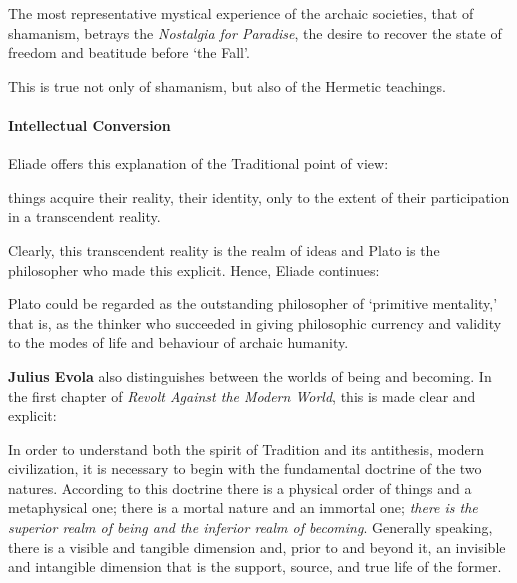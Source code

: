 \begin{quotex}
The most representative mystical experience of the archaic societies, that of shamanism, betrays the \emph{Nostalgia for Paradise}, the desire to recover the state of freedom and beatitude before `the Fall'.
\end{quotex}


This is true not only of shamanism, but also of the Hermetic teachings.

\paragraph{Intellectual Conversion}


Eliade offers this explanation of the Traditional point of view:

\begin{quotex} 
things acquire their reality, their identity, only to the extent of their participation in a transcendent reality.
\end{quotex}


Clearly, this transcendent reality is the realm of ideas and Plato is the philosopher who made this explicit. Hence, Eliade continues:

\begin{quotex}
Plato could be regarded as the outstanding philosopher of `primitive mentality,' that is, as the thinker who succeeded in giving philosophic currency and validity to the modes of life and behaviour of archaic humanity.
\end{quotex}


\textbf{Julius Evola} also distinguishes between the worlds of being and becoming. In the first chapter of \emph{Revolt Against the Modern World}, this is made clear and explicit:

\begin{quotex}
In order to understand both the spirit of Tradition and its antithesis, modern civilization, it is necessary to begin with the fundamental doctrine of the two natures. According to this doctrine there is a physical order of things and a metaphysical one; there is a mortal nature and an immortal one; \emph{there is the superior realm of being and the inferior realm of becoming}. Generally speaking, there is a visible and tangible dimension and, prior to and beyond it, an invisible and intangible dimension that is the support, source, and true life of the former.
\end{quotex}


